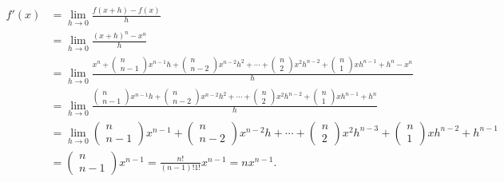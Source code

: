 \documentclass[12pt,reqno]{article}
\theoremstyle{definition}
\begin{document}
\begin{align*}
	f'(x) &= \lim_{h \to 0} \frac{f(x + h) - f(x)}{h} \\
		  &= \lim_{h \to 0} \frac{(x + h)^n - x^n}{h} \\
		  &= \lim_{h \to 0}  \frac{x^n + \begin{pmatrix}
		  		n \\ n - 1
		  	\end{pmatrix} x^{n - 1} h + \begin{pmatrix}
		  		n \\ n - 2
		  	\end{pmatrix} x^{n - 2} h^2 + \cdots + \begin{pmatrix}
		  		n \\ 2 
		  	\end{pmatrix} x^2 h^{n - 2} + \begin{pmatrix}
		  		n \\ 1
		  	\end{pmatrix} xh^{n - 1} + h^{n} - x^n}{h} \\
	  	  &= \lim_{h \to 0} \frac{\begin{pmatrix}
	  	  		n \\ n - 1
	  	  	\end{pmatrix} x^{n - 1} h + \begin{pmatrix}
	  	  		n \\ n - 2
	  	  	\end{pmatrix} x^{n - 2} h^2 + \cdots + \begin{pmatrix}
	  	  		n \\ 2 
	  	  	\end{pmatrix} x^2 h^{n - 2} + \begin{pmatrix}
	  	  		n \\ 1
	  	  	\end{pmatrix} xh^{n - 1} + h^{n}}{h} \\
  	  	&= \lim_{h \to 0} \begin{pmatrix}
  	  		n \\ n - 1
  	  	\end{pmatrix} x^{n - 1}  + \begin{pmatrix}
  	  		n \\ n - 2
  	  	\end{pmatrix} x^{n - 2} h + \cdots + \begin{pmatrix}
  	  		n \\ 2 
  	  	\end{pmatrix} x^2 h^{n - 3} + \begin{pmatrix}
  	  		n \\ 1
  	  	\end{pmatrix} xh^{n - 2} + h^{n - 1} \\
    	&= \begin{pmatrix}
    		n \\ n - 1
    	\end{pmatrix} x^{n - 1} = \frac{n!}{(n - 1)! 1!} x^{n - 1} = n x^{n - 1}. 
\end{align*}
\end{document}
